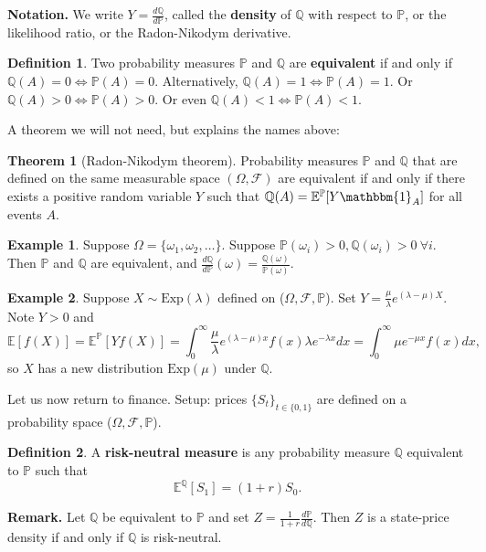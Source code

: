 \documentclass{article}
\theoremstyle{definition}
\newtheorem{theorem}{Theorem}[section]
\newtheorem{example}{Example}[section]
\newtheorem{defn}{Definition}[section]
\begin{document}
\textbf{Notation.} We write $Y = \frac{d \mathbb{Q}}{d \mathbb{P}}$, called the \textbf{density} of $\mathbb{Q}$ with respect to $\mathbb{P}$, or the likelihood ratio, or the Radon-Nikodym derivative.

\begin{defn}
    Two probability measures $\mathbb{P}$ and $\mathbb{Q}$ are \textbf{equivalent} if and only if $\mathbb{Q}(A) = 0 \iff \mathbb{P}(A) = 0$. Alternatively, $\mathbb{Q}(A) = 1 \iff \mathbb{P}(A) = 1$. Or $\mathbb{Q}(A) > 0 \iff \mathbb{P}(A) > 0$. Or even $\mathbb{Q}(A) < 1 \iff \mathbb{P}(A) < 1$.  
\end{defn}

A theorem we will not need, but explains the names above:
\begin{theorem}[Radon-Nikodym theorem]
    Probability measures $\mathbb{P}$ and $\mathbb{Q}$ that are defined on the same measurable space $(\Omega, \mathcal{F})$ are equivalent if and only if there exists a positive random variable $Y$ such that $\mathbb{Q}(A) = \mathbb{E}^{\mathbb{P}}[Y \mathbbm{1}_A]$ for all events $A$.
\end{theorem}

\begin{example}
    Suppose $\Omega = \{\omega_1, \omega_2, \ldots\}$. Suppose $\mathbb{P}(\omega_i)>0, \mathbb{Q}(\omega_i)>0 ~\forall i$. Then $\mathbb{P}$ and $\mathbb{Q}$ are equivalent, and $\frac{d\mathbb{Q}}{d\mathbb{P}}(\omega) = \frac{\mathbb{Q}(\omega)}{\mathbb{P}(\omega)}$.
\end{example}
\begin{example}
    Suppose $X \sim \text{Exp}(\lambda)$ defined on ($\Omega, \mathcal{F}, \mathbb{P}$). Set $Y = \frac{\mu}{\lambda}e^{(\lambda-\mu)X}$. Note $Y>0$ and 
    \[
    \mathbb{E}[f(X)] = \mathbb{E}^{\mathbb{P}}[Yf(X)] = \int_{0}^{\infty} \frac{\mu}{\lambda} e^{(\lambda-\mu)x} f(x) \lambda e^{-\lambda x} dx = \int_{0}^{\infty} \mu e^{-\mu x} f(x) dx,
    \] so $X$ has a new distribution $\text{Exp}(\mu)$ under $\mathbb{Q}$.
\end{example}

Let us now return to finance. Setup: prices $\{S_t\}_{t \in \{0,1\}}$ are defined on a probability space ($\Omega, \mathcal{F}, \mathbb{P}$). 

\begin{defn}
    A \textbf{risk-neutral measure} is any probability measure $\mathbb{Q}$ equivalent to $\mathbb{P}$ such that \[
    \mathbb{E}^{\mathbb{Q}}[S_1] = (1+r)S_0.
    \]
\end{defn}
\textbf{Remark.} Let $\mathbb{Q}$ be equivalent to $\mathbb{P}$ and set $Z =\frac{1}{1+r} \frac{d \mathbb{P}}{d \mathbb{Q}}$. Then $Z$ is a state-price density if and only if $\mathbb{Q}$ is risk-neutral.
\end{document}
